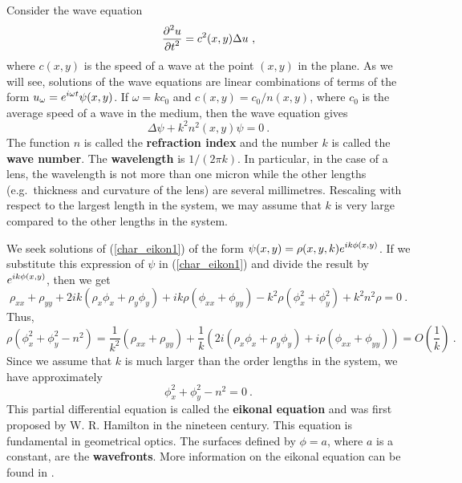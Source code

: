 \begin{egg}
Consider the wave equation                   \label{char_egg_eikonal}
\[
\frac{\displaystyle \partial^{2}{u}} {\displaystyle \partial t^{2}} = c^2(x,y) \Delta u \ ,
\]
where $c(x,y)$ is the speed of a wave at the point $(x,y)$ in the
plane.  As we will see, solutions of the wave equations are linear
combinations of terms of the form
$\displaystyle u_\omega = e^{i\omega t} \psi(x,y)$.
If $\omega = k c_0$ and $c(x,y) = c_0/n(x,y)$, where $c_0$ is the
average speed of a wave in the medium, then the wave equation gives
\begin{equation} \label{char_eikon1}
\Delta \psi + k^2 n^2(x,y) \psi = 0 \ .
\end{equation}
The function $n$ is called the
{\bfseries refraction index} and the
number $k$ is called the {\bfseries wave number}.  The
{\bfseries wavelength} is $1/(2\pi k)$.  In
particular, in the case of a lens, the wavelength is not more than one
micron while the other lengths (e.g.\ thickness and curvature of the
lens) are several millimetres.  Rescaling with respect to the largest
length in the system, we may assume that $k$ is very large compared to
the other lengths in the system.

We seek solutions of (\ref{char_eikon1}) of the form
$\displaystyle \psi(x,y) = \rho(x,y,k) e^{ik\phi(x,y)}$.
If we substitute this expression of $\psi$ in (\ref{char_eikon1}) and
divide the result by $\displaystyle e^{ik\phi(x,y)}$, then we get
\[
\rho_{xx}+\rho_{yy} + 2ik\left(\rho_x\phi_x+\rho_y\phi_y\right)
+ ik\rho \left(\phi_{xx} + \phi_{yy}\right)
-k^2 \rho\left( \phi_x^2 + \phi_y^2\right) + k^2 n^2\rho = 0 \  .
\]
Thus,
\[
\rho\left( \phi_x^2 + \phi_y^2 - n^2\right) =
\frac{1}{k^2} \left(\rho_{xx}+\rho_{yy}\right) +
\frac{1}{k} \left( 2i\left(\rho_x\phi_x+\rho_y\phi_y\right)
+ i\rho \left(\phi_{xx} + \phi_{yy}\right) \right) =
O\left(\frac{1}{k}\right) \ .
\]
Since we assume that $k$ is much larger than the order lengths in the
system, we have approximately
\begin{equation} \label{char_eikonal}
\phi_x^2 + \phi_y^2 - n^2 = 0 \ .
\end{equation}
This partial differential equation is called the
{\bfseries eikonal equation} and was first
proposed by W. R. Hamilton in the nineteen century.  This equation is
fundamental in geometrical optics.  The surfaces defined by $\phi = a$,
where $a$ is a constant, are the {\bfseries wavefronts}.
More information on the eikonal equation can be found in
\cite{J,McO,PinRub}.


\end{egg}
